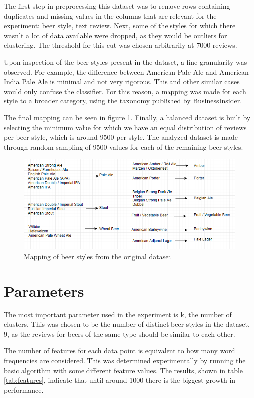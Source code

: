 \documentclass[12pt]{article}
\begin{document}
	The first step in preprocessing this dataset was to remove rows containing duplicates and missing values in the columns that are relevant for the experiment: beer style, text review. Next, some of the styles for which there wasn't a lot of data available were dropped, as they would be outliers for clustering. The threshold for this cut was chosen arbitrarily at 7000 reviews. 
	
	Upon inspection of the beer styles present in the dataset, a fine granularity was observed. For example, the difference between American Pale Ale and American India Pale Ale is minimal and not very rigorous. This and other similar cases would only confuse the classifier. For this reason, a mapping was made for each style to a broader category, using the taxonomy published by BusinessInsider\cite{BeerTaxonomy}. 
	
	The final mapping can be seen in figure \ref{fig:styleMapping}. Finally, a balanced dataset is built by selecting the minimum value for which we have an equal distribution of reviews per beer style, which is around 9500 per style. The analyzed dataset is made through random sampling of 9500 values for each of the remaining beer styles.
	
	\begin{figure}
		\includegraphics[width=\linewidth]{resources/MappingDiagram.png}
		\caption{Mapping of beer styles from the original dataset}
		\label{fig:styleMapping}
	\end{figure}

	\section{Parameters}
	The most important parameter used in the experiment is k, the number of clusters. This was chosen to be the number of distinct beer styles in the dataset, 9, as the reviews for beers of the same type should be similar to each other.
	
	The number of features for each data point is equivalent to how many word frequencies are considered. This was determined experimentally by running the basic algorithm with some different feature values. The results, shown in table \ref{tab:features}, indicate that until around 1000 there is the biggest growth in performance.
	
\end{document}
